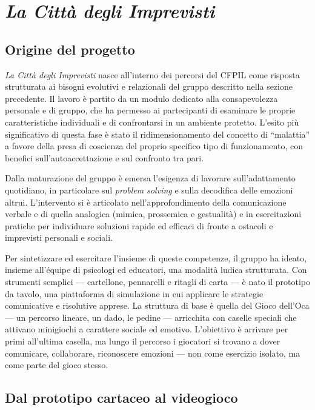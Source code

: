 \documentclass[12pt]{report}
\begin{document}
\section{\textit{La Città degli Imprevisti}}
\label{sec:lcdi}

\subsection{Origine del progetto}

\textit{La Città degli Imprevisti} nasce all'interno dei percorsi del CFPIL come risposta strutturata ai bisogni evolutivi e relazionali del gruppo descritto nella sezione precedente. Il lavoro è partito da un modulo dedicato alla consapevolezza personale e di gruppo, che ha permesso ai partecipanti di esaminare le proprie caratteristiche individuali e di confrontarsi in un ambiente protetto. L'esito più significativo di questa fase è stato il ridimensionamento del concetto di ``malattia'' a favore della presa di coscienza del proprio specifico tipo di funzionamento, con benefici sull'autoaccettazione e sul confronto tra pari.

Dalla maturazione del gruppo è emersa l'esigenza di lavorare sull'adattamento quotidiano, in particolare sul \textit{problem solving} e sulla decodifica delle emozioni altrui. L'intervento si è articolato nell'approfondimento della comunicazione verbale e di quella analogica (mimica, prossemica e gestualità) e in esercitazioni pratiche per individuare soluzioni rapide ed efficaci di fronte a ostacoli e imprevisti personali e sociali.

Per sintetizzare ed esercitare l'insieme di queste competenze, il gruppo ha ideato, insieme all'équipe di psicologi ed educatori, una modalità ludica strutturata. Con strumenti semplici --- cartellone, pennarelli e ritagli di carta --- è nato il prototipo da tavolo, una piattaforma di simulazione in cui applicare le strategie comunicative e risolutive apprese. La struttura di base è quella del Gioco dell'Oca --- un percorso lineare, un dado, le pedine --- arricchita con caselle speciali che attivano minigiochi a carattere sociale ed emotivo.
L'obiettivo è arrivare per primi all'ultima casella, ma lungo il percorso i giocatori si trovano a dover comunicare, collaborare, riconoscere emozioni --- non come esercizio isolato, ma come parte del gioco stesso.

\subsection{Dal prototipo cartaceo al videogioco}
\end{document}
